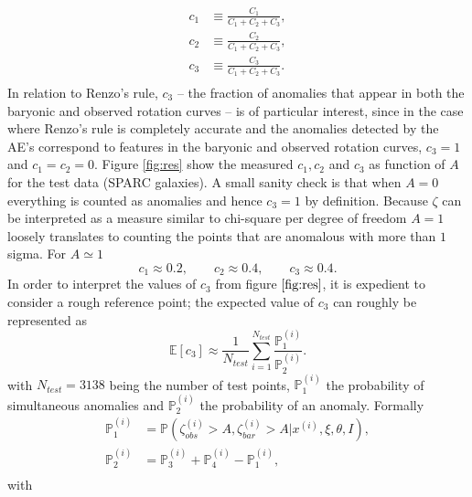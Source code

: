 \begin{example}
	\begin{equation}
		\begin{split}
			c_1 &\equiv \frac{C_1}{C_1+C_2+C_3},\\
			c_2 &\equiv \frac{C_2}{C_1+C_2+C_3},\\
			c_3 &\equiv \frac{C_3}{C_1+C_2+C_3}.\\
		\end{split}
	\end{equation}
	In relation to Renzo's rule, $c_3$ -- the fraction of anomalies that appear in both the baryonic and observed rotation curves -- is of particular interest, since in the case where Renzo's rule is completely accurate and the anomalies detected by the AE's correspond to features in the baryonic and observed rotation curves, $c_3=1$ and $c_1=c_2=0$. Figure \ref{fig:res} show the measured $c_1,c_2$ and $c_3$ as function of $A$ for the test data (SPARC galaxies). A small sanity check is that when $A=0$ everything is counted as anomalies and hence $c_3=1$ by definition. Because $\zeta$ can be interpreted as a measure similar to chi-square per degree of freedom $A=1$ loosely translates to counting the points that are anomalous with more than $1$ sigma. For $A\simeq 1$
	\begin{equation}
		c_1\approx 0.2, \qquad c_2\approx 0.4, \qquad c_3\approx 0.4.
		\label{res}
	\end{equation}
	In order to interpret the values of $c_3$ from figure $\ref{fig:res}$, it is expedient to consider a rough reference point; the expected value of $c_3$ can roughly be represented as
	\begin{equation}
		\mathbb{E}[c_3]\approx\frac{1}{N_{test}}\sum_{i=1}^{N_{test}}\frac{\mathbb{P}_1^{(i)}}{\mathbb{P}_2^{(i)}}.
		\label{P3}
	\end{equation}
	with $N_{test} = 3138$ being the number of test points, $\mathbb{P}_1^{(i)}$ the probability of simultaneous anomalies and $\mathbb{P}_2^{(i)}$ the probability of an anomaly. Formally
	\begin{equation}
		\begin{split}
			\mathbb{P}^{(i)}_1&=\mathbb{P}(\zeta^{(i)}_{obs}>A,\zeta^{(i)}_{bar}>A|x^{(i)},\xi,\theta,I),\\
			\mathbb{P}^{(i)}_2& = \mathbb{P}_3^{(i)}+\mathbb{P}_4^{(i)}-\mathbb{P}_1^{(i)},\\
		\end{split}
		\label{eq1a}
	\end{equation}
	with
	\begin{equation}

\end{equation}
\end{example}
